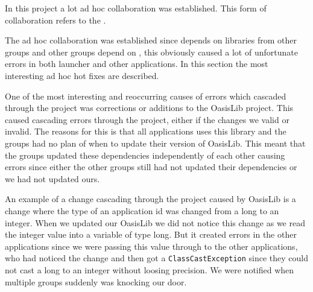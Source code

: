 In this project a lot ad hoc collaboration was established.
This form of collaboration refers to the \Cref{}.\\ 

The ad hoc collaboration was established since \launcher depends on libraries from other groups and other groups depend on \launcher, this obviously caused a lot of unfortunate errors in both launcher and other applications.
In this section the most interesting ad hoc hot fixes are described.

One of the most interesting and reoccurring causes of errors which cascaded through the \giraf project was corrections or additions to the OasisLib project.
This caused cascading errors through the project, either if the changes we valid or invalid.
The reasons for this is that all applications uses this library and the groups had no plan of when to update their version of OasisLib.
This meant that the groups updated these dependencies independently of each other causing errors since either the other groups still had not updated their dependencies or we had not updated ours.

An example of a change cascading through the project caused by OasisLib is a change where the type of an application id was changed from a long to an integer.
When we updated our OasisLib we did not notice this change as we read the integer value into a variable of type long.
But it created errors in the other applications since we were passing this value through to the other applications, who had noticed the change and then got a \lstinline!ClassCastException! since they could not cast a long to an integer without loosing precision.
We were notified when multiple groups suddenly was knocking our door.





